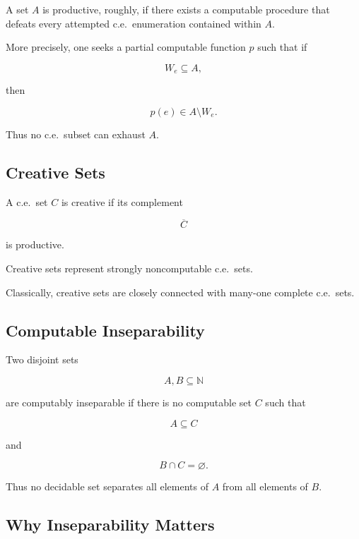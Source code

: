 A set \(A\) is productive, roughly, if there exists a computable procedure
that defeats every attempted c.e.\ enumeration contained within \(A\).

More precisely, one seeks a partial computable function \(p\) such that if

\[
W_e\subseteq A,
\]

then

\[
\boxed{
p(e)\in A\setminus W_e.
}
\]

Thus no c.e.\ subset can exhaust \(A\).

\subsection{Creative Sets}
\label{subsec:creative-sets}

A c.e.\ set \(C\) is creative if its complement

\[
\boxed{
\overline{C}
}
\]

is productive.

Creative sets represent strongly noncomputable c.e.\ sets.

Classically, creative sets are closely connected with many-one complete
c.e.\ sets.

\subsection{Computable Inseparability}
\label{subsec:computable-inseparability}

Two disjoint sets

\[
A,B\subseteq\mathbb{N}
\]

are computably inseparable if there is no computable set \(C\) such that

\[
\boxed{
A\subseteq C
}
\]

and

\[
\boxed{
B\cap C=\varnothing.
}
\]

Thus no decidable set separates all elements of \(A\) from all elements of
\(B\).

\subsection{Why Inseparability Matters}
\label{subsec:why-inseparability-matters}

